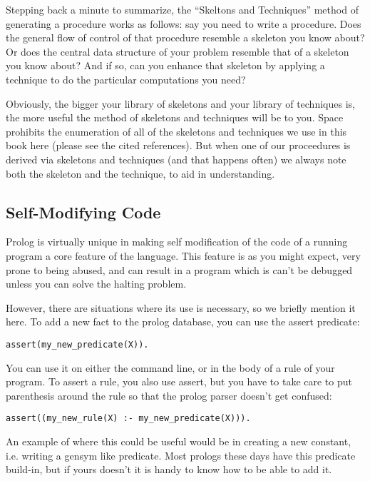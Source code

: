 \documentclass{book}[9pt]
\begin{document}
Stepping back a minute to summarize, the ``Skeltons and Techniques''
method of generating a procedure works as follows: say you need to
write a procedure.  Does the general flow of control of that procedure
resemble a skeleton you know about?  Or does the central data
structure of your problem resemble that of a skeleton you know about?
And if so, can you enhance that skeleton by applying a technique to do
the particular computations you need?

Obviously, the bigger your library of skeletons and your library of
techniques is, the more useful the method of skeletons and techniques
will be to you.  Space prohibits the enumeration of all of the
skeletons and techniques we use in this book here (please see the
cited references).  But when one of our proceedures is derived via
skeletons and techniques (and that happens often) we always note both
the skeleton and the technique, to aid in understanding.

\subsection{Self-Modifying Code}

Prolog is virtually unique in making self modification of the code of
a running program a core feature of the language.  This feature is
as you might expect, very prone to being abused, and can result in
a program which is can't be debugged unless you can solve the 
halting problem.

However, there are situations where its use is necessary, so we
briefly mention it here.  To add a new fact to the prolog database,
you can use the assert predicate:
\begin{verbatim}
assert(my_new_predicate(X)).
\end{verbatim}
\noindent  You can use it on either the command line, or in the body
of a rule of your program.  To assert a rule, you also use assert, but
you have to take care to put parenthesis around the rule so that the
prolog parser doesn't get confused:

\begin{verbatim}
assert((my_new_rule(X) :- my_new_predicate(X))).
\end{verbatim}


An example of where this could be useful would be in creating a new
constant, i.e. writing a gensym like predicate. Most prologs these
days have this predicate build-in, but if yours doesn't it is handy to
know how to be able to add it.
\end{document}
